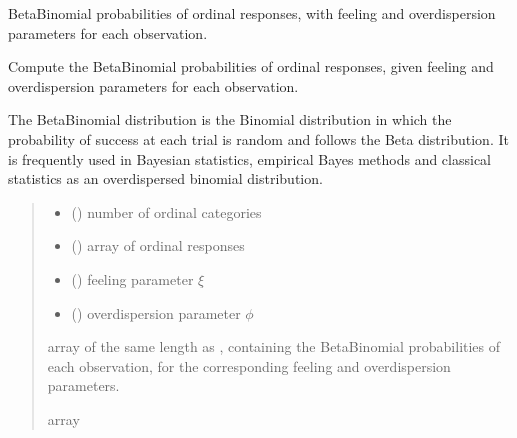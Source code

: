 \documentclass[letterpaper,10pt,english]{sphinxmanual}
\begin{document}

\begin{fulllineitems}
\label{\detokenize{cubmods:cubmods.cube_ywz.betabinomial}}
\pysigstartsignatures
{}
\pysigstopsignatures
\sphinxAtStartPar
Beta\sphinxhyphen{}Binomial probabilities of ordinal responses, with feeling and overdispersion parameters
for each observation.

\sphinxAtStartPar
Compute the Beta\sphinxhyphen{}Binomial probabilities of ordinal responses, given feeling and overdispersion
parameters for each observation.

\sphinxAtStartPar
The Beta\sphinxhyphen{}Binomial distribution is the Binomial distribution in which the probability of success at
each trial is random and follows the Beta distribution. It is frequently used in Bayesian 
statistics, empirical Bayes methods and classical statistics as an overdispersed binomial distribution.
\begin{quote}\begin{description}
\begin{itemize}
\item {} 
\sphinxAtStartPar
{} () \textendash{} number of ordinal categories

\item {} 
\sphinxAtStartPar
{} () \textendash{} array of ordinal responses

\item {} 
\sphinxAtStartPar
{} () \textendash{} feeling parameter \(\xi\)

\item {} 
\sphinxAtStartPar
{} () \textendash{} overdispersion parameter \(\phi\)

\end{itemize}

\sphinxAtStartPar
array of the same length as , containing the Beta\sphinxhyphen{}Binomial probabilities of each observation,
for the corresponding feeling and overdispersion parameters.

\sphinxAtStartPar
array

\end{description}\end{quote}

\end{fulllineitems}
\end{document}
